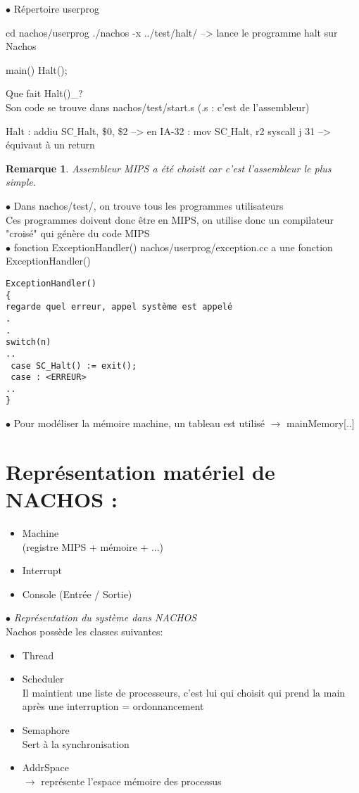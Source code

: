 \documentclass[12pt,a4paper]{report}
\newtheorem*{rem}{Remarque}
\begin{document}
\bigskip
$\bullet$ Répertoire userprog
\begin{verbatimtab}
cd nachos/userprog
./nachos -x ../test/halt/   --> lance le programme halt sur Nachos

 main()
{
 Halt();
}
\end{verbatimtab}

Que fait Halt()_? \\
Son code se trouve dans nachos/test/start.s (.s : c'est de l'assembleur)\\
\begin{verbatimtab}
Halt : addiu SC$\_$Halt, \$0, \$2     --> en IA-32 : mov SC$\_$Halt, r2
       syscall
       j 31            --> équivaut à un return
\end{verbatimtab}

\begin{rem}Assembleur MIPS a été choisit car c'est l'assembleur le plus simple.\end{rem}

\bigskip

$\bullet$ Dans nachos/test/, on trouve tous les programmes utilisateurs\\
Ces programmes doivent donc être en MIPS, on utilise donc un compilateur "croisé" qui génère du code MIPS\\

$\bullet$ fonction ExceptionHandler()
nachos/userprog/exception.cc a une fonction ExceptionHandler()
\begin{verbatim}
ExceptionHandler()
{
regarde quel erreur, appel système est appelé
.
.
switch(n)
..
 case SC_Halt() := exit();
 case : <ERREUR>
..
}
\end{verbatim}

$\bullet$ Pour modéliser la mémoire machine, un tableau est utilisé $\rightarrow$ mainMemory[..]


\section{Représentation matériel de NACHOS :}
\begin{itemize}
\item Machine\\
(registre MIPS + mémoire + ...)
\item Interrupt
\item Console
(Entrée / Sortie)
\\
\end{itemize}

$\bullet$ \textit{Représentation du système dans NACHOS\\}
Nachos possède les classes suivantes:
\begin{itemize}
\item Thread
\item Scheduler\\
Il maintient une liste de processeurs, c'est lui qui choisit qui prend la main après une interruption = ordonnancement
\item Semaphore\\
Sert à la synchronisation
\item AddrSpace\\
$\rightarrow$ représente l'espace mémoire des processus
\end{itemize}
\end{document}

